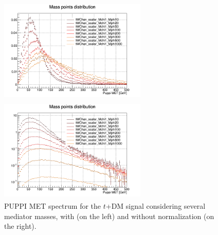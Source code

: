 \documentclass[a4paper, 10pt, openright]{report}
\begin{document}
\begin{figure}[htbp]
\centering
\begin{minipage}[b]{.48\textwidth}
\includegraphics[width=7cm, height=5cm]{figs/singleTopMETNorm.png}
\end{minipage}\hfill
\begin{minipage}[b]{.48\textwidth}
\includegraphics[width=7cm, height=5cm]{figs/singleTopMET.png}
\end{minipage} \hfill
\caption{\ac{PUPPI} \ac{MET} spectrum for the $t$+DM signal considering several mediator masses, with (on the left) and without normalization (on the right).}
\label{fig:signalSingle}
\end{figure}
\end{document}
